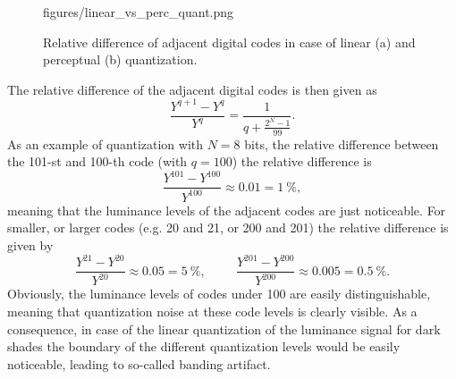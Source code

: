 \begin{figure}[]
	\centering
	\begin{overpic}[width = 1\columnwidth ]{figures/linear_vs_perc_quant.png}
	\end{overpic}
	\caption{
Relative difference of adjacent digital codes in case of linear (a) and perceptual (b) quantization.}
	\label{Fig:linear_vs_perc_quant}
\end{figure}

The relative difference of the adjacent digital codes is then given as
\begin{equation}
\frac{Y^{q+1}-Y^q}{Y^q} = \frac{1 }{q + \frac{2^N - 1}{99}}.
\label{Eq:rel_dif}
\end{equation}
As an example of quantization with $N = 8$ bits, the relative difference between the 101-st and 100-th code (with $q = 100$) the relative difference is
\begin{equation*}
\frac{Y^{101}-Y^{100}}{Y^{100}} \approx 0.01 = 1~\%,
\end{equation*}
meaning that the luminance levels of the adjacent codes are just noticeable.
For smaller, or larger codes (e.g. 20 and 21, or 200 and 201) the relative difference is given by
\begin{equation*}
\frac{Y^{21}-Y^{20}}{Y^{20}} \approx 0.05 = 5~\%, \hspace{1cm} \frac{Y^{201}-Y^{200}}{Y^{200}} \approx 0.005 = 0.5~\%.
\label{eq:code_100}
\end{equation*}
Obviously, the luminance levels of codes under 100 are easily distinguishable, meaning that quantization noise at these code levels is clearly visible.
As a consequence, in case of the linear quantization of the luminance signal for dark shades the boundary of the different quantization levels would be easily noticeable, leading to so-called banding artifact.

